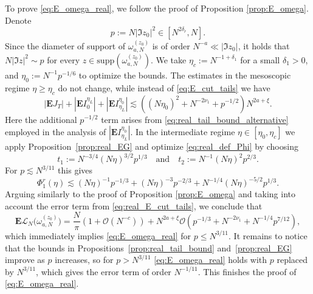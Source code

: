 \documentclass[10pt]{amsart}
\numberwithin{equation}{section}
\newcommand{\E}{\mathbf{E}}
\begin{document}
To prove \eqref{eq:E_omega_real}, we follow the proof of Proposition \ref{prop:E_omega}. Denote 
\begin{equation*}
p:=N|\Im z_0|^2\in [N^{2\delta_r},N].
\end{equation*}
Since the diameter of support of $\omega_{a,N}^{(z_0)}$ is of order $N^{-a}\ll |\Im z_0|$, it holds that $N|\Im z|^2\sim p$ for every $z\in\mathrm{supp}(\omega_{a,N}^{(z_0)})$. We take $\eta_c:=N^{-1+\delta_1}$ for a small $\delta_1>0$, and $\eta_0:=N^{-1}p^{-1/6}$ to optimize the bounds. The estimates in the mesoscopic regime $\eta\ge \eta_c$ do not change, while instead of \eqref{eq:E_cut_tails} we have
\begin{equation}
|\E J_T| + |\E I_{0}^{\eta_L}|+|\E I_{\eta_L}^{\eta_0}|\lesssim ((N\eta_0)^2+N^{-2\nu_1} + p^{-1/2})N^{2a+\xi}.
\label{eq:real_E_cut_tails}
\end{equation}
Here the additional $p^{-1/2}$ term arises from \eqref{eq:real_tail_bound_alternative} employed in the analysis of $|\E I_{\eta_L}^{\eta_0}|$. In the intermediate regime $\eta\in [\eta_0,\eta_c]$ we apply Proposition~\ref{prop:real_EG} and optimize \eqref{eq:real_def_Phi} by choosing 
\begin{equation*}
t_1:=N^{-3/4}(N\eta)^{3/2}p^{1/3}\quad\text{and}\quad t_2:= N^{-1}(N\eta)^2 p^{2/3}.
\end{equation*}
For $p\lesssim N^{3/11}$ this gives
\begin{equation*}
\Phi_1^r(\eta)\lesssim  (N\eta)^{-1}p^{-1/3} + (N\eta)^{-3}p^{-2/3} + N^{-1/4}(N\eta)^{-5/2}p^{1/3}.
\end{equation*}
Arguing similarly to the proof of Proposition \ref{prop:E_omega} and taking into account the error term from \eqref{eq:real_E_cut_tails}, we conclude that
\begin{equation*}
\E\mathcal{L}_N\big(\omega_{a,N}^{(z_0)}\big) = \frac{N}{\pi}\left(1+\mathcal{O}(N^{-c})\right) +N^{2a+\xi}\mathcal{O}\left(p^{-1/3} + N^{-2\nu_1}+N^{-1/4} p^{7/12} \right),
\end{equation*}
which immediately implies \eqref{eq:E_omega_real} for $p\le N^{3/11}$. It remains to notice that the bounds in Propositions~\ref{prop:real_tail_bound} and~\ref{prop:real_EG} improve as $p$ increases, so for $p>N^{3/11}$ \eqref{eq:E_omega_real} holds with $p$ replaced by $N^{3/11}$, which gives the error term of order $N^{-1/11}$. This finishes the proof of \eqref{eq:E_omega_real}.
\end{document}
